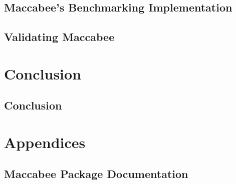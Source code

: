 \documentclass[oneside, fleqn]{book}
\begin{document}
\chapter{Maccabee's Benchmarking Implementation}
\label{chap:macimplementation}

\chapter{Validating Maccabee}
\label{chap:macvalidation}


\part{Conclusion}
\chapter{Conclusion}
\label{chap:conclusion}


\part{Appendices}
\appendix
\chapter{Maccabee Package Documentation}
\label{app:package-docs}


\backmatter

 
\end{document}
